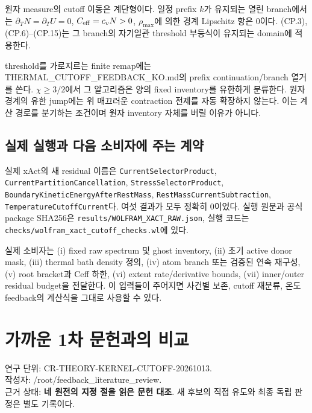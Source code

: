 \documentclass[11pt,a4paper]{article}
\begin{document}
원자 measure의 cutoff 이동은 계단형이다. 일정 prefix \(k\)가 유지되는 열린 branch에서는 \(\partial_TN=\partial_TU=0\), \(C_{\rm eff}=c_vN>0\), \(\rho_{\max}\)에 의한 경계 Lipschitz 항은 0이다. (CP.3), (CP.6)--(CP.15)는 그 branch의 자기일관 threshold 부등식이 유지되는 domain에 적용한다.

threshold를 가로지르는 finite remap에는 THERMAL\_CUTOFF\_FEEDBACK\_KO.md의 prefix continuation/branch 열거를 쓴다. \(\chi\ge3/2\)에서 그 알고리즘은 양의 fixed inventory를 유한하게 분류한다. 원자 경계의 유한 jump에는 위 매끄러운 contraction 전제를 자동 확장하지 않는다. 이는 계산 경로를 분기하는 조건이며 원자 inventory 자체를 버릴 이유가 아니다.

\hypertarget{uxc2e4uxc81c-uxc2e4uxd589uxacfc-uxb2e4uxc74c-uxc18cuxbe44uxc790uxc5d0-uxc8fcuxb294-uxacc4uxc57d}{%
\subsection{실제 실행과 다음 소비자에 주는 계약}\label{uxc2e4uxc81c-uxc2e4uxd589uxacfc-uxb2e4uxc74c-uxc18cuxbe44uxc790uxc5d0-uxc8fcuxb294-uxacc4uxc57d}}

실제 xAct의 새 residual 이름은 \texttt{CurrentSelectorProduct}, \nolinkurl{CurrentPartitionCancellation}, \texttt{StressSelectorProduct}, \nolinkurl{BoundaryKineticEnergyAfterRestMass}, \texttt{RestMassCurrentSubtraction}, \texttt{TemperatureCutoffCurrent}다. 여섯 결과가 모두 정확히 0이었다. 실행 원문과 공식 package SHA256은 \texttt{results/WOLFRAM\_XACT\_RAW.json}, 실행 코드는 \nolinkurl{checks/wolfram_xact_cutoff_checks.wl}에 있다.

실제 소비자는 (i) fixed raw spectrum 및 ghost inventory, (ii) 초기 active donor mask, (iii) thermal bath density 정의, (iv) atom branch 또는 검증된 연속 재구성, (v) root bracket과 Ceff 하한, (vi) extent rate/derivative bounds, (vii) inner/outer residual budget을 전달한다. 이 입력들이 주어지면 사건별 보존, cutoff 재분류, 온도 feedback의 계산식을 그대로 사용할 수 있다.

\clearpage

\hypertarget{uxac00uxae4cuxc6b4-1uxcc28-uxbb38uxd5ccuxacfcuxc758-uxbe44uxad50}{%
\section{가까운 1차 문헌과의 비교}\label{uxac00uxae4cuxc6b4-1uxcc28-uxbb38uxd5ccuxacfcuxc758-uxbe44uxad50}}

\begingroup
\small

연구 단위: CR-THEORY-KERNEL-CUTOFF-20261013.\\
작성자: /root/feedback\_literature\_review.\\
근거 상태: \textbf{네 원전의 지정 절을 읽은 문헌 대조}. 새 후보의 직접 유도와 최종 독립 판정은 별도 기록이다.
\end{document}
